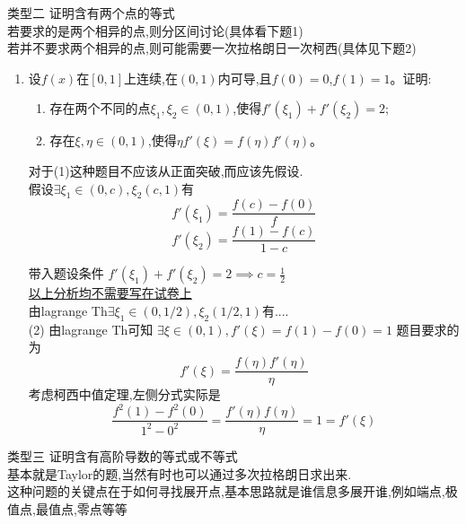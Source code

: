 \documentclass[12pt, a4paper, oneside, UTF8]{ctexbook}
\begin{document}
\begin{remark}类型二 证明含有两个点的等式 \\
若要求的是两个相异的点,则分区间讨论(具体看下题1) \\
若并不要求两个相异的点,则可能需要一次拉格朗日一次柯西(具体见下题2) 
\end{remark}

\begin{enumerate}[label=\arabic*.,start=27]
    \item  设$f(x)$在$[0,1]$上连续,在$(0,1)$内可导,且$f(0)=0$,$f(1)=1$。证明:
    \begin{enumerate}[label=(\roman*)]
        \item 存在两个不同的点$\xi_1,\xi_2\in(0,1)$,使得$f'(\xi_1)+f'(\xi_2)=2$;
        \item 存在$\xi,\eta\in(0,1)$,使得$\eta f'(\xi)=f(\eta)f'(\eta)$。
    \end{enumerate}
    
    \begin{solution}
    对于(1)这种题目不应该从正面突破,而应该先假设.
    \\ 假设$\exists\xi_1\in(0,c),\xi_2(c,1)$有
    $$
    f'(\xi_1)=\frac{f(c)-f(0)}{f}
    $$
    $$
    f'(\xi_2)=\frac{f(1)-f(c)}{1-c}
    $$

    带入题设条件 $f'(\xi_1)+f'(\xi_2)=2 \implies c = \frac{1}{2}$  \\
    \underline{以上分析均不需要写在试卷上} \\
    由lagrange Th$\exists\xi_1\in(0,1/2),\xi_2(1/2,1)$有.... \\
    (2) 由lagrange Th可知 $\exists\xi\in(0,1),f'(\xi)=f(1)-f(0)=1$ 题目要求的为 
    $$
        f'(\xi)=\frac{f(\eta)f'(\eta)}{\eta}
    $$
    考虑柯西中值定理,左侧分式实际是 
    $$
        \frac{f^{2}(1)-f^{2}(0)}{1^2-0^2}=\frac{f'(\eta)f(\eta)}{\eta} = 1 = f'(\xi)
    $$
    \end{solution}
\end{enumerate}

\begin{remark}类型三 证明含有高阶导数的等式或不等式 \\
    基本就是Taylor的题,当然有时也可以通过多次拉格朗日求出来. \\
    这种问题的关键点在于如何寻找展开点,基本思路就是谁信息多展开谁,例如端点,极值点,最值点,零点等等 
\end{remark}
\end{document}
